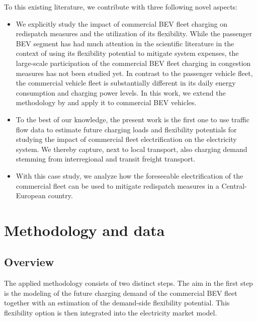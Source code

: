 \documentclass[final,10pt]{elsarticle}
\begin{document}
     To this existing literature, we contribute with three following novel aspects:
     \begin{itemize}
         \item We explicitly study the impact of commercial \ac{BEV} fleet charging on redispatch measures and the utilization of its flexibility. While the passenger \ac{BEV} segment has had much attention in the scientific literature in the context of using its flexibility potential to mitigate system expenses, the large-scale participation of the commercial \ac{BEV} fleet charging in congestion measures has not been studied yet. In contrast to the passenger 
         vehicle fleet, the commercial vehicle fleet is substantially different in its daily energy consumption and charging power levels. In this work, we extend the methodology by \citet{LOSCHAN2023108802} and apply it to commercial \ac{BEV} vehicles.

         \item To the best of our knowledge, the present work is the first one to use traffic flow data to estimate future charging loads and flexibility potentials for studying the impact of commercial fleet electrification on the electricity system. We thereby capture, next to local transport, also charging demand stemming from interregional and transit freight transport.
         
         \item {} With this case study, we analyze how the foreseeable electrification of the commercial fleet can be used to mitigate redispatch measures in a Central-European country.
     \end{itemize}

\section{Methodology and data}
    \subsection{Overview}
        The applied methodology consists of two distinct steps. The aim in the first step is the modeling of the future charging demand of the commercial \ac{BEV} fleet together with an estimation of the demand-side flexibility potential. This flexibility option is then integrated into the electricity market model. 
\end{document}
